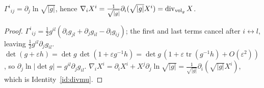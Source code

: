 \begin{identity}\label{id:divagree}
$\Gamma^i{}_{ij}=\partial_j\ln\sqrt{|g|}$, hence $\nabla_iX^i=\frac1{\sqrt{|g|}}\partial_i(\sqrt{|g|}X^i)=\operatorname{div}_{\mathrm{vol}_g}X$.
\end{identity}
\begin{proof}
 $\Gamma^i{}_{ij}=\frac12g^{il}(\partial_ig_{jl}+\partial_jg_{il}-\partial_lg_{ij})$; the first and last terms cancel after $i\leftrightarrow l$, leaving $\frac12g^{il}\partial_jg_{il}$.
 $\det(g+\varepsilon h)=\det g\,\det(1+\varepsilon g^{-1}h)=\det g\,(1+\varepsilon\operatorname{tr}(g^{-1}h)+O(\varepsilon^2))$, so $\partial_j\ln|\det g|=g^{il}\partial_jg_{il}$.
 $\nabla_iX^i=\partial_iX^i+X^j\partial_j\ln\sqrt{|g|}=\frac1{\sqrt{|g|}}\partial_i(\sqrt{|g|}X^i)$, which is Identity~\ref{id:divmu}.
\end{proof}
